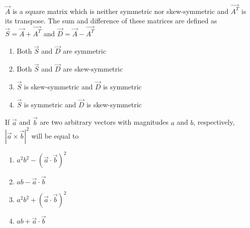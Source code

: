 \item $\Vec{A}$  is a square matrix which is neither symmetric nor skew-symmetric and $\Vec{A^T}$ is its transpose. The sum and difference of these matrices are defined as $\Vec{S}=\Vec{A}+\Vec{A^T}$ and $\Vec{D}=\Vec{A}-\Vec{A^T}$
\hfill{}
\begin{enumerate}
\item Both $\Vec{S}$ and $\Vec{D}$ are symmetric
\item Both $\Vec{S}$ and $\Vec{D}$ are skew-symmetric
\item $\vec{S}$ is skew-symmetric and $\vec{D}$ is symmetric
\item $\vec{S}$ is symmetric and $\vec{D}$ is skew-symmetric
\end{enumerate}
\item If $\vec{a}$ and $\vec{b}$ are two arbitrary vectors with magnitudes $a$ and $b$, respectively, $|\vec{a} \times \vec{b}|^2$ will be equal to
\hfill{}
\begin{multicols}{4}
\begin{enumerate}
\item $a^2 b^2 - \left(\vec{a} \cdot \vec{b}\right)^2$
\item $ab - \vec{a} \cdot \vec{b}$
\item $a^2 b^2 + \left(\vec{a} \cdot \vec{b}\right)^2$
\item $ab + \vec{a} \cdot \vec{b}$
\end{enumerate}
\end{multicols}
